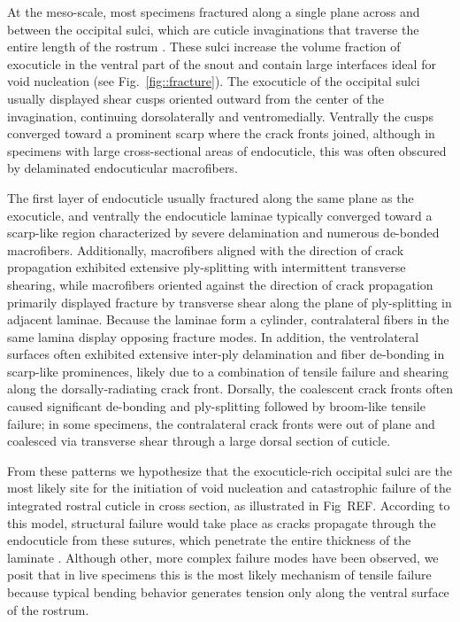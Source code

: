 \documentclass[twocolumn, linenumbers, superscriptaddress, nofootinbib]{revtex4-1}
\begin{document}
		At the meso-scale, most specimens fractured along a single plane across and between the occipital sulci, which are cuticle invaginations that traverse the entire length of the rostrum \cite{Davis2014, Dennell1942}.
		These sulci increase the volume fraction of exocuticle in the ventral part of the snout and contain large interfaces ideal for void nucleation (see Fig.~\ref{fig::fracture}).
		The exocuticle of the occipital sulci usually displayed shear cusps oriented outward from the center of the invagination, continuing dorsolaterally and ventromedially.
		Ventrally the cusps converged toward a prominent scarp where the crack fronts joined, although in specimens with large cross-sectional areas of endocuticle, this was often obscured by delaminated endocuticular macrofibers.
		
		The first layer of endocuticle usually fractured along the same plane as the exocuticle, and ventrally the endocuticle laminae typically converged toward a scarp-like region characterized by severe delamination and numerous de-bonded macrofibers.
		Additionally, macrofibers aligned with the direction of crack propagation exhibited extensive ply-splitting with intermittent transverse shearing, while macrofibers oriented against the direction of crack propagation primarily displayed fracture by transverse shear along the plane of ply-splitting in adjacent laminae.
		Because the laminae form a cylinder, contralateral fibers in the same lamina display opposing fracture modes.
		In addition, the ventrolateral surfaces often exhibited extensive inter-ply delamination and fiber de-bonding in scarp-like prominences, likely due to a combination of tensile failure and shearing along the dorsally-radiating crack front.
		Dorsally, the coalescent crack fronts often caused significant de-bonding and ply-splitting followed by broom-like tensile failure; in some specimens, the contralateral crack fronts were out of plane and coalesced via transverse shear through a large dorsal section of cuticle.
		
		From these patterns we hypothesize that the exocuticle-rich occipital sulci are the most likely site for the initiation of void nucleation and catastrophic failure of the integrated rostral cuticle in cross section, as illustrated in Fig~REF.
		According to this model, structural failure would take place as cracks propagate through the endocuticle from these sutures, which penetrate the entire thickness of the laminate \cite{Davis2014}.
		Although other, more complex failure modes have been observed, we posit that in live specimens this is the most likely mechanism of tensile failure because typical bending behavior generates tension only along the ventral surface of the rostrum.
\end{document}
